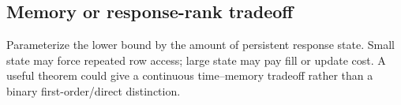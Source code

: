 \subsection{Memory or response-rank tradeoff}

Parameterize the lower bound by the amount of persistent response state.
Small state may force repeated row access; large state may pay fill or update
cost.  A useful theorem could give a continuous time--memory tradeoff rather
than a binary first-order/direct distinction.
